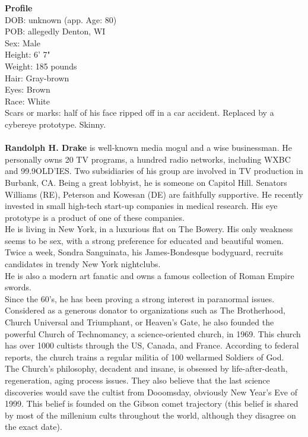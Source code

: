 \documentclass[11pt,twoside,a4paper]{book}
\begin{document}
\textbf{Profile }~\\
DOB: unknown (app. Age: 80)~\\
POB: allegedly Denton, WI~\\
Sex: Male~\\
Height: 6' 7"~\\
Weight: 185 pounds~\\
Hair: Gray-brown~\\
Eyes: Brown~\\
Race: White~\\
Scars or marks: half of his face ripped off in a car accident. Replaced by a cybereye prototype. Skinny.~\\~\\


\textbf{Randolph H. Drake} is well-known media mogul and a wise businessman. He personally owns 20 TV programs, a hundred radio networks, including WXBC and 99.9OLD'IES. Two subsidiaries of his group are involved in TV production in Burbank, CA. Being a great lobbyist, he is someone on Capitol Hill. Senators Williams (RE), Peterson and Kowesan (DE) are faithfully supportive. He recently invested in small high-tech start-up companies in medical research. His eye prototype is a product of one of these companies.~\\

He is living in New York, in a luxurious flat on The Bowery. His only weakness seems to be sex, with a strong preference for educated and beautiful women. Twice a week, Sondra Sanguinata, his James-Bondesque bodyguard, recruits candidates in trendy New York nightclubs.~\\

He is also a modern art fanatic and owns a famous collection of Roman Empire swords.~\\

Since the 60's, he has been proving a strong interest in paranormal issues. Considered as a generous donator to organizations such as The Brotherhood, Church Universal and Triumphant, or Heaven's Gate, he also founded the powerful Church of Technomancy, a science-oriented church, in 1969. This church has over 1000 cultists through the US, Canada, and France. According to federal reports, the church trains a regular militia of 100 wellarmed Soldiers of God.~\\

The Church's philosophy, decadent and insane, is obsessed by life-after-death, regeneration, aging process issues. They also believe that the last science discoveries would save the cultist from Dooomsday, obviously New Year's Eve of 1999. This belief is founded on the Gibson comet trajectory (this belief is shared by most of the millenium cults throughout the world, although they disagree on the exact date).~\\
\end{document}
